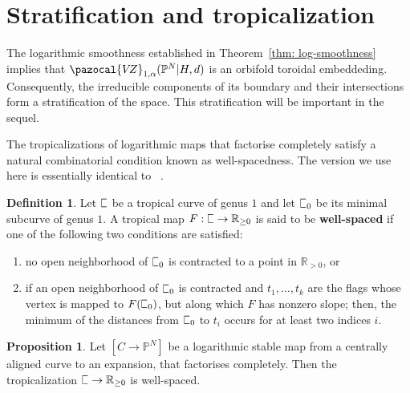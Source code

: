 \documentclass[11pt]{amsart}
\newcommand{\plC}{\scalebox{0.8}[1.3]{$\sqsubset$}}
\newcommand{\VZ}{\pazocal{V\!Z}}
\renewcommand{\to}{\rightarrow}
\theoremstyle{definition}
\newtheorem{prop}[thm]{Proposition}
\theoremstyle{definition}
\newtheorem{definition}[thm]{Definition}
\begin{document}
\section{Stratification and tropicalization}

\noindent The logarithmic smoothness established in Theorem~\ref{thm: log-smoothness} implies that $\VZ_{1,\alpha}(\mathbb P^N|H,d)$ is an orbifold toroidal embeddeding. Consequently, the irreducible components of its boundary and their intersections form a stratification of the space. This stratification will be important in the sequel. 

The tropicalizations of logarithmic maps that factorise completely satisfy a natural combinatorial condition known as well-spacedness. The version we use here is essentially identical to~
\cite{RSPW2}. 

\begin{definition}
Let $\plC$ be a tropical curve of genus $1$ and let $\plC_0$ be its minimal subcurve of genus $1$. A tropical map $F: \plC\to \mathbb R_{\geq 0}$ is said to be \textbf{well-spaced} if one of the following two conditions are satisfied:
\begin{enumerate}
    \item no open neighborhood of $\plC_0$ is contracted to a point in $\mathbb R_{>0}$, or
    \item if an open neighborhood of $\plC_0$ is contracted and $t_1,\ldots,t_k$ are the flags whose vertex is mapped to $F(\plC_0)$, but along which $F$ has nonzero slope; then, the minimum of the distances from $\plC_0$ to $t_i$ occurs for at least two indices $i$.
\end{enumerate}
\end{definition}

\begin{prop}\label{prop: well-spaced}
Let $[C\to \mathbb P^N]$ be a logarithmic stable map from a centrally aligned curve to an expansion, that factorises completely. Then the tropicalization $\plC\to \mathbb R_{\geq 0}$ is well-spaced.
\end{prop}
\end{document}
